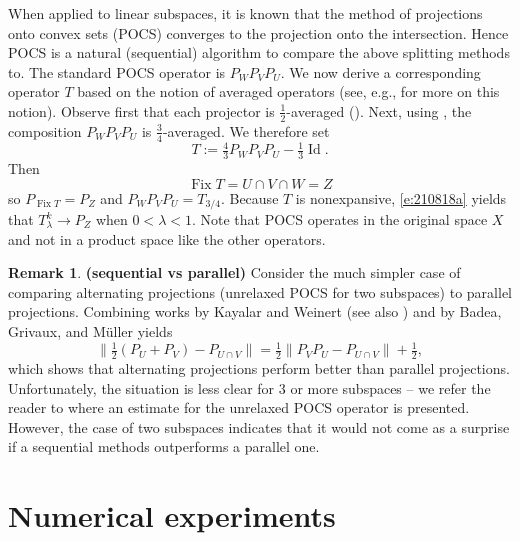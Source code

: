 \documentclass[11pt]{article}
\newcommand{\thalb}{\ensuremath{\tfrac{1}{2}}}
\newcommand{\Fix}{\ensuremath{\operatorname{Fix}}}
\newcommand{\Id}{\ensuremath{\operatorname{Id}}}
\theoremstyle{definition}
\newtheorem{remark}[theorem]{Remark}
\providecommand{\Id}{\operatorname{{ Id}}}
\providecommand{\Id}{\operatorname{Id}}
\begin{document}
{{When applied to linear subspaces, it is known that the method of projections onto convex sets (POCS) converges to the projection onto the intersection. Hence POCS is a natural (sequential) algorithm to compare
the above splitting methods to. 
The standard POCS operator is $P_WP_VP_U$.
We now derive a corresponding operator $T$ based on the notion
of averaged operators 
(see, e.g., \cite[Section~4.5]{BC2017} for more on this notion).
Observe first that each projector is $\thalb$-averaged (\cite[Remark~4.34(iii)]{BC2017}). Next, using \cite[Proposition~4.46]{BC2017}, the composition
$P_WP_VP_U$ is $\tfrac{3}{4}$-averaged. We therefore set 
\begin{equation}
\label{e:RPOCS}
T := \tfrac{4}{3}P_WP_VP_U-\tfrac{1}{3}\Id.
\end{equation}
Then 
\begin{equation}
\Fix T = U\cap V\cap W = Z
\end{equation}
so $P_{\Fix T }= P_Z$ and $P_WP_VP_U = T_{3/4}$. 
Because $T$ is nonexpansive, \cref{e:210818a} yields that 
$T^k_\lambda \to P_{Z}$ when $0<\lambda<1$. 
Note that POCS operates in the original space $X$ and not in a product space like the other operators. 

\begin{remark} {\bf (sequential vs parallel)}
Consider the much simpler case of comparing alternating projections (unrelaxed POCS for two subspaces) to parallel projections. 
Combining works by Kayalar and Weinert \cite[Theorem~2]{KW} 
(see also \cite[Theorem~9.31]{Deutsch}) and 
by Badea, Grivaux, and M\"uller \cite[Proposition~3.7]{BGM} 
yields 
\begin{equation}
\|\thalb(P_U+P_V)-P_{U\cap V}\|= \thalb\|P_VP_U-P_{U\cap V}\|+\thalb,
\end{equation}
which shows that alternating projections perform better than parallel projections. Unfortunately, the situation is less clear 
for $3$ or more subspaces -- we refer the reader to \cite[Theorem~4.4.(i)]{BGM} where 
an estimate for the unrelaxed POCS operator is presented. 
However, the case of two subspaces indicates that it would not come as a surprise if a sequential methods outperforms a parallel one. 
\end{remark}


}

\section{Numerical experiments}


}
\end{document}
